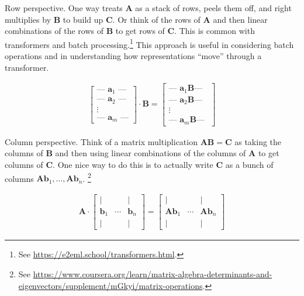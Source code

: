 Row perspective. One way treats $\mathbf{A}$ as a stack of rows, peels them off, and right multiplies by $\mathbf{B}$ to build up $\mathbf{C}$. Or think of the rows of $\mathbf{A}$ and then linear combinations of the rows of $\mathbf{B}$ to get rows of $\mathbf{C}$. This is common with transformers and batch processing.\footnote{See \url{ https://e2eml.school/transformers.html}.} This approach is useful in considering batch operations and in understanding how representations ``move'' through a transformer.

\begin{align*}
\begin{bmatrix}
\text{--- } \mathbf{a}_1 \text{ ---} \\
\text{--- } \mathbf{a}_2 \text{ ---} \\
\vdots \\
\text{--- } \mathbf{a}_m \text{ ---}
\end{bmatrix}
\cdot
\mathbf{B}
=
\begin{bmatrix}
\text{--- } \mathbf{a}_1 \mathbf{B} \text{--- } \\
\text{--- } \mathbf{a}_2 \mathbf{B} \text{--- } \\
\vdots \\
\text{--- } \mathbf{a}_m \mathbf{B} \text{--- }
\end{bmatrix}
\end{align*}

Column perspective. Think of a matrix multiplication $\mathbf{A}\mathbf{B} = \mathbf{C}$ as taking the columns of $\mathbf{B}$ and then using linear combinations of the columns of $\mathbf{A}$ to get columns of $\mathbf{C}$. One nice way to do this is to actually write $\mathbf{C}$ as a bunch of columns $\mathbf{A}\mathbf{b}_1, \dots, \mathbf{A}\mathbf{b}_n$. \footnote{See \url{https://www.coursera.org/learn/matrix-algebra-determinants-and-eigenvectors/supplement/mGkyi/matrix-operations}.}

\begin{align*}
\mathbf{A} \cdot
\begin{bmatrix}
\vert &        & \vert \\
\mathbf{b}_1 & \cdots & \mathbf{b}_n \\
\vert &        & \vert
\end{bmatrix}
=
\begin{bmatrix}
\vert &        & \vert \\
\mathbf{A} \mathbf{b}_1 & \cdots & \mathbf{A} \mathbf{b}_n \\
\vert &        & \vert
\end{bmatrix}
\end{align*}
